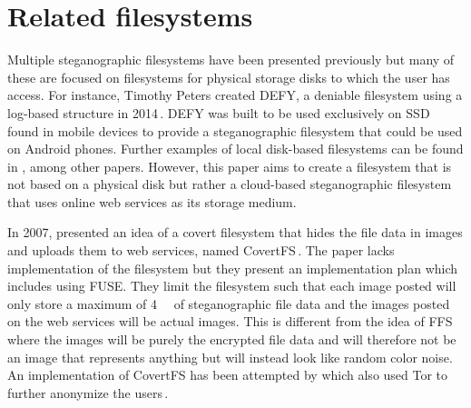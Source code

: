 \section{Related filesystems}
\label{sec:rel_fs}
Multiple steganographic filesystems have been presented previously but many of these are focused on filesystems for physical storage disks to which the user has access. For instance, Timothy Peters created DEFY, a deniable filesystem using a \mbox{log-based} structure in 2014\,\cite{petersDEFYDeniableFile2014}. DEFY was built to be used exclusively on \gls{SSD} found in mobile devices to provide a steganographic filesystem that could be used on Android phones. Further examples of local \mbox{disk-based} filesystems can be found in \cite{andersonSteganographicFileSystem1998, mcdonaldStegFSSteganographicFile2000, domingo-ferrerSharedSteganographicFile2008, hanMultiuserSteganographicFile2010}, among other papers. However, this paper aims to create a filesystem that is not based on a physical disk but rather a \mbox{cloud-based} steganographic filesystem that uses online web services as its storage medium. 

In 2007, \citeauthor{baliga2007web} presented an idea of a covert filesystem that hides the file data in images and uploads them to web services, named CovertFS\,\cite{baliga2007web}. The paper lacks implementation of the filesystem but they present an implementation plan which includes using \gls{FUSE}. They limit the filesystem such that each image posted will only store a maximum of \SI{4}{\kilo\byte} of steganographic file data and the images posted on the web services will be actual images. This is different from the idea of \gls{FFS} where the images will be purely the encrypted file data and will therefore not be an image that represents anything but will instead look like random color noise. An implementation of CovertFS has been attempted by \citeauthor{sosaSuperSecretFile2007} which also used Tor to further anonymize the users\,\cite{sosaSuperSecretFile2007}.

